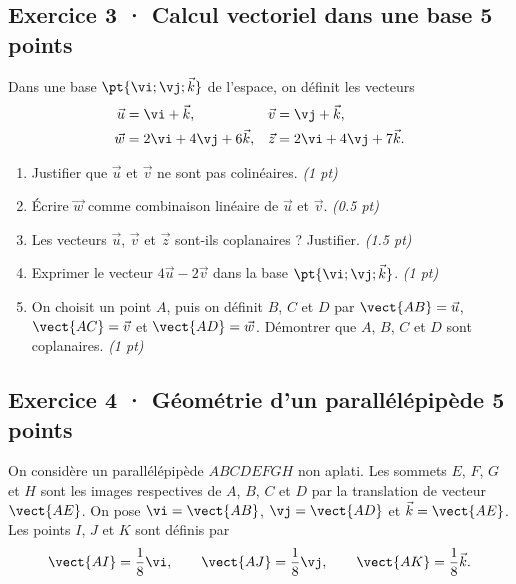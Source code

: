 \mxnewpage{}

\subsection*{Exercice 3 · Calcul vectoriel dans une base \hfill 5 points}Dans une base $\pt{\vi;\vj;\vec k}$ de l'espace, on définit les vecteurs
\[\begin{aligned}\vec u&=\vi+\vec k,&\vec v&=\vj+\vec k,\\
\vec w&=2\vi+4\vj+6\vec k,&\vec z&=2\vi+4\vj+7\vec k.\end{aligned}\]

\begin{enumerate}

\item Justifier que $\vec u$ et $\vec v$ ne sont pas colinéaires. \hfill\textit{(1 pt)}

\item Écrire $\vec w$ comme combinaison linéaire de $\vec u$ et $\vec v$. \hfill\textit{(\num{0,5} pt)}

\item Les vecteurs $\vec u$, $\vec v$ et $\vec z$ sont-ils coplanaires ? Justifier. \hfill\textit{(\num{1,5} pt)}

\item Exprimer le vecteur $4\vec u-2\vec v$ dans la base $\pt{\vi;\vj;\vec k}$. \hfill\textit{(1 pt)}

\item On choisit un point $A$, puis on définit $B$, $C$ et $D$ par $\vect{AB}=\vec u$, $\vect{AC}=\vec v$ et $\vect{AD}=\vec w$. Démontrer que $A$, $B$, $C$ et $D$ sont coplanaires. \hfill\textit{(1 pt)}

\end{enumerate}

\subsection*{Exercice 4 · Géométrie d'un parallélépipède \hfill 5 points}On considère un parallélépipède $ABCDEFGH$ non aplati. Les sommets $E$, $F$, $G$ et $H$ sont les images respectives de $A$, $B$, $C$ et $D$ par la translation de vecteur $\vect{AE}$.
On pose $\vi=\vect{AB}$, $\vj=\vect{AD}$ et $\vec k=\vect{AE}$.
Les points $I$, $J$ et $K$ sont définis par
\[\vect{AI}=\frac1{8}\vi,\qquad\vect{AJ}=\frac1{8}\vj,\qquad\vect{AK}=\frac1{8}\vec k.\]

